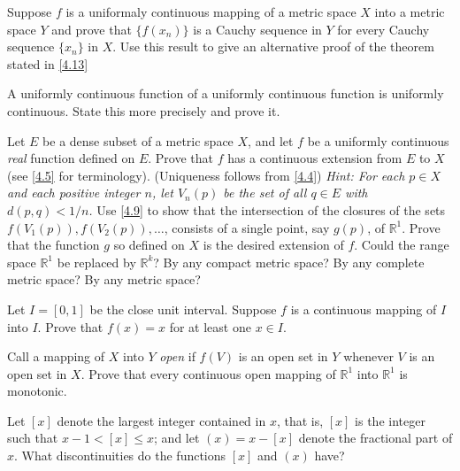 \begin{exercise}
\item
  Suppose \(f\) is a uniformaly continuous mapping of a metric space \(X\)
  into a metric space \(Y\) and prove that \(\{f(x_n)\}\) is a Cauchy sequence
  in \(Y\) for every Cauchy sequence \(\{x_n\}\) in \(X\).
  Use this result to give an alternative proof of the theorem stated in
  \cref{4.13}
\item
  A uniformly continuous function of a uniformly continuous function is
  uniformly continuous.
  State this more precisely and prove it.
\item
  \label{4.13}
  Let \(E\) be a dense subset of a metric space \(X\), and let \(f\) be a
  uniformly continuous \textit{real} function defined on \(E\).
  Prove that \(f\) has a continuous extension from \(E\) to \(X\)
  (see \cref{4.5} for terminology).
  (Uniqueness follows from \cref{4.4})
  \textit{Hint: For each \(p\in X\) and each positive integer \(n\), let
    \(V_n(p)\) be the set of all \(q\in E\) with \(d(p,q) < 1/n\).}
  Use \cref{4.9} to show that the intersection of the closures of the sets
  \(f(V_1(p)),f(V_2(p)),\ldots\), consists of a single point, say \(g(p)\), of
  \(\mathbb{R}^1\).
  Prove that the function \(g\) so defined on \(X\) is the desired extension
  of \(f\).
  Could the range space \(\mathbb{R}^1\) be replaced by \(\mathbb{R}^k\)?
  By any compact metric space?
  By any complete metric space?
  By any metric space?
\item
  Let \(I = [0,1]\) be the close unit interval.
  Suppose \(f\) is a continuous mapping of \(I\) into \(I\).
  Prove that \(f(x) = x\) for at least one \(x\in I\).
\item
  Call a mapping of \(X\) into \(Y\) \textit{open} if \(f(V)\) is an open set
  in \(Y\) whenever \(V\) is an open set in \(X\).
  Prove that every continuous open mapping of \(\mathbb{R}^1\) into
  \(\mathbb{R}^1\) is monotonic.
\item
  Let \([x]\) denote the largest integer contained in \(x\), that is, \([x]\)
  is the integer such that \(x - 1 < [x]\leq x\); and let \((x) = x - [x]\)
  denote the fractional part of \(x\).
  What discontinuities do the functions \([x]\) and \((x)\) have?
  \par\smallskip
  

\end{exercise}
